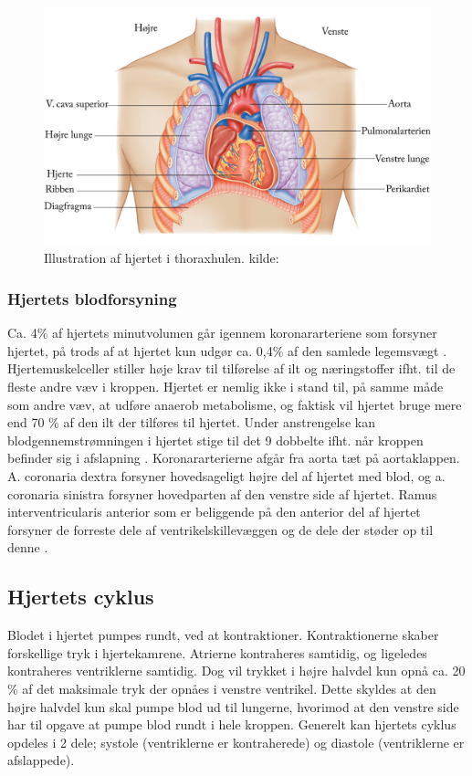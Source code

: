 \begin{figure}[H] %
\begin{center}
\includegraphics[width=1\textwidth]{figures/thorax}
\end{center}
\caption{Illustration af hjertet i thoraxhulen. kilde: \cite{cindy}}
\label{fig:hjerte_placering}
\end{figure}

\subsubsection{Hjertets blodforsyning}
Ca. 4\% af hjertets minutvolumen går igennem koronararteriene som forsyner hjertet, på trods af at hjertet kun udgør ca. 0,4\% af den samlede legemsvægt \cite{gronanatomi}. Hjertemuskelceller stiller høje krav til tilførelse af ilt og næringstoffer ifht. til de fleste andre væv i kroppen. Hjertet er nemlig ikke i stand til, på samme måde som andre væv, at udføre anaerob metabolisme, og faktisk vil hjertet bruge mere end 70 \% af den ilt der tilføres til hjertet. Under anstrengelse kan blodgennemstrømningen i hjertet stige til det 9 dobbelte ifht. når kroppen befinder sig i afslapning \cite{martini}. Koronararterierne afgår fra aorta tæt på aortaklappen. A. coronaria dextra forsyner hovedsageligt højre del af hjertet med blod, og a. coronaria sinistra forsyner hovedparten af den venstre side af hjertet. Ramus interventricularis anterior som er beliggende på den anterior del af hjertet forsyner de forreste dele af ventrikelskillevæggen og de dele der støder op til denne \cite{gronanatomi}.


\subsection{Hjertets cyklus}
Blodet i hjertet pumpes rundt, ved at kontraktioner. Kontraktionerne skaber forskellige tryk i hjertekamrene. Atrierne kontraheres samtidig, og ligeledes kontraheres ventriklerne samtidig. Dog vil trykket i højre halvdel kun opnå ca. 20 \% af det maksimale tryk der opnåes i venstre ventrikel. Dette skyldes at den højre halvdel kun skal pumpe blod ud til lungerne, hvorimod at den venstre side har til opgave at pumpe blod rundt i hele kroppen. Generelt kan hjertets cyklus opdeles i 2 dele; systole (ventriklerne er kontraherede)  og diastole (ventriklerne er afslappede). 

